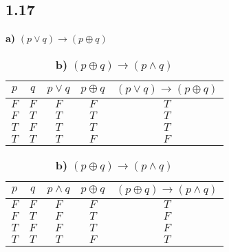\documentclass[10pt]{ctexart}
\begin{document}
    \subsection*{1.17}
    \begin{table}[h]
        \begin{subtable}[h]{3in}
            \setlength{\abovecaptionskip}{0pt}
            \setlength{\belowcaptionskip}{0pt}
            \centering
            \caption*{\textbf{a)} $(p \vee q) \rightarrow (p \oplus q)$}
            \begin{tabular}{|c|c|c|c|c|}
                \hline
                $p$ & $q$ & $p \vee q$ & $p \oplus q$ & $(p \vee q) \rightarrow (p \oplus q)$ \\ 
                \hline
                $F$ & $F$ & $F$ & $F$ & $T$ \\ 
                \hline
                $F$ & $T$ & $T$ & $T$ & $T$ \\ 
                \hline
                $T$ & $F$ & $T$ & $T$ & $T$ \\ 
                \hline
                $T$ & $T$ & $T$ & $F$ & $F$ \\ 
                \hline
            \end{tabular}
        \end{subtable}
        \begin{subtable}[h]{3in}
            \setlength{\abovecaptionskip}{0pt}
            \setlength{\belowcaptionskip}{0pt}
            \centering
            \caption*{\textbf{b)} $(p \oplus q) \rightarrow (p \wedge q)$}
            \begin{tabular}{|c|c|c|c|c|}
                \hline
                $p$ & $q$ & $p \wedge q$ & $p \oplus q$ & $(p \oplus q) \rightarrow (p \wedge q)$ \\ 
                \hline
                $F$ & $F$ & $F$ & $F$ & $T$ \\ 
                \hline
                $F$ & $T$ & $F$ & $T$ & $F$ \\ 
                \hline
                $T$ & $F$ & $F$ & $T$ & $F$ \\ 
                \hline
                $T$ & $T$ & $T$ & $F$ & $T$ \\ 
                \hline
            \end{tabular}
        \end{subtable}
    \end{table}
\end{document}
